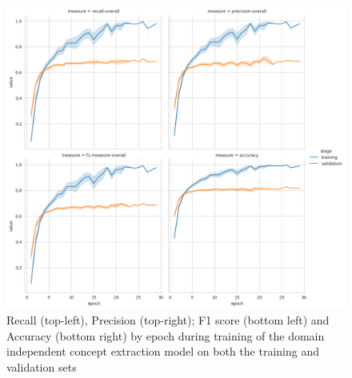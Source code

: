 \documentclass[11pt,a4paper]{article}
\begin{document}
\begin{figure}
    \centering
    \includegraphics[width=15.5cm]{images/scibert.training_log.overall.png}
    \caption{Recall (top-left), Precision (top-right); F1 score (bottom left) and Accuracy (bottom right) by epoch during training of the domain independent concept extraction model on both the training and validation sets}
    \label{fig:scibert-training-overall}
\end{figure}
\end{document}
